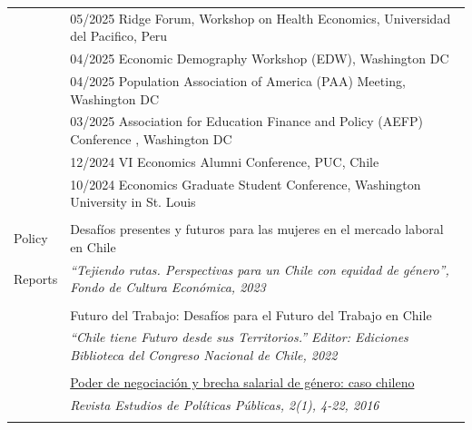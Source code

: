 \documentclass[letterpaper,11pt,oneside]{article}
\begin{document}
\begin{tabular}{@{} l l l}
 & \multicolumn{2}{l}{05/2025 \hspace{0.1in} Ridge Forum, Workshop on Health Economics, Universidad del Pacifico, Peru}  \\ 
 & \multicolumn{2}{l}{04/2025 \hspace{0.1in} Economic Demography Workshop (EDW), Washington DC}  \\
 & \multicolumn{2}{l}{04/2025 \hspace{0.1in} Population Association of America (PAA) Meeting, Washington DC}  \\
 & \multicolumn{2}{l}{03/2025 \hspace{0.1in} Association for Education Finance and Policy (AEFP) Conference , Washington DC}  \\
 & \multicolumn{2}{l}{12/2024 \hspace{0.1in} VI Economics Alumni Conference, PUC, Chile}  \\ 
 & \multicolumn{2}{l}{10/2024 \hspace{0.1in} Economics Graduate Student Conference, Washington University in St. Louis }  \\ 
 \\
 

\Large{Policy} & \multicolumn{2}{l}{{Desafíos presentes y futuros para las mujeres en el mercado laboral en Chile}}\\
\Large{Reports}    & \multicolumn{2}{l}{\parbox{6.0in}{\textit{“Tejiendo rutas. Perspectivas para un Chile con equidad de género”, Fondo de Cultura Económica, 2023}}}\\ \\

 & \multicolumn{2}{l}{{Futuro del Trabajo: Desafíos para el Futuro del Trabajo en Chile}} \\
  & \multicolumn{2}{l}{\parbox{6.0in}{\textit{“Chile tiene Futuro desde sus Territorios.” Editor: Ediciones Biblioteca del Congreso Nacional de Chile, 2022}}}\\  \\

  & \multicolumn{2}{l}{\href{https://revistaestudiospoliticaspublicas.uchile.cl/index.php/REPP/article/view/41822}{Poder de negociación y brecha salarial de género: caso chileno}}\\ 
  & \multicolumn{2}{l}{\textit{Revista Estudios de Políticas Públicas, 2(1), 4-22, 2016}} \\ \\




\end{tabular}
\end{document}
